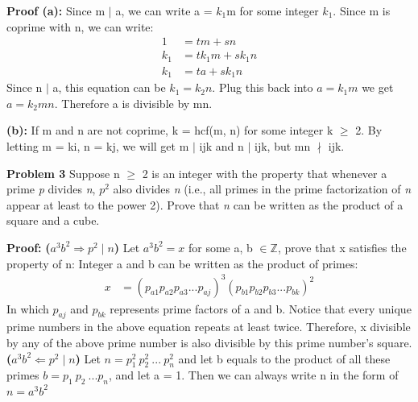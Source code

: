 \documentclass[12pt,letterpaper]{hmcpset}
\begin{document}
\begin{solution}
\textbf{Proof (a):} Since m $\mid$ a, we can write a = $k_1$m for some integer $k_1$. Since m is coprime with n, we can write:
\begin{align*}
1 &= tm + sn		\\
k_1	&= tk_1m + sk_1n	\\
k_1	&= ta + sk_1n
\end{align*} 
Since n $\mid$ a, this equation can be $k_1 = k_2n$. Plug this back into $a = k_1m$ we get $a = k_2mn$. Therefore a is divisible by mn.
\end{solution}


\begin{solution}
\textbf{(b):} If m and n are not coprime, k = hcf(m, n) for some integer k $\ge$ 2. By letting m = ki, n = kj, we will get m $\mid$ ijk and n $\mid$ ijk, but mn $\nmid$ ijk.
\end{solution}

\begin{problem}
\textbf{Problem 3} Suppose n $\geqslant$ 2 is an integer with the property that whenever a prime \emph{p} divides \emph{n}, $p^{2}$ also divides \emph{n} (i.e., all primes in the prime factorization of \emph{n} appear at least to the power 2). Prove that \emph{n} can be written as the product of a square and a cube.
\end{problem}

\begin{solution}
\textbf{Proof:}
\newline \textbf{($a^{3}b^{2} \Rightarrow p^{2} \mid n $)}
\newline Let $a^{3}b^{2}=x$ for some a, b $\in\mathbb{Z}$, prove that x satisfies the property of n:
\newline Integer a and b can be written as the product of primes:
\begin{align*}
x	&= (p_{a1}p_{a2}p_{a3}...p_{aj})^{3}(p_{b1}p_{b2}p_{b3}...p_{bk})^{2}
\end{align*}
In which $p_{aj}$ and $p_{bk}$ represents prime factors of a and b. Notice that every unique prime numbers in the above equation repeats at least twice. Therefore, x divisible by any of the above prime number is also divisible by this prime number's square.
\newline\newline \textbf{($a^{3}b^{2} \Leftarrow p^{2} \mid n $)}
\newline Let $n=p_1^{2}\ p_2^{2}\ ...\ p_n^{2}$ and let b equals to the product of all these primes $b=p_1\ p_2\ ... p_n$, and let a = 1. Then we can always write n in the form of $n = a^{3}b^{2}$
\end{solution}
\end{document}

